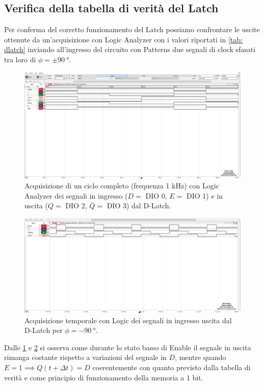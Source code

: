 \documentclass[10pt, a4paper, italian]{article}
\begin{document}
\subsection{Verifica della tabella di verità del Latch}
Per conferma del corretto funzionamento del Latch possiamo confrontare
le uscite ottenute da un'acquisizione con Logic Analyzer con i valori
riportati in \cref{tab: dlatch} inviando all'ingresso del circuito con
Patterns due segnali di clock sfasati tra loro di
$\phi = \pm \SI{90}{\degree}$.
\begin{figure}[htbp]
    \centering
    \includegraphics[width=\textwidth]{dlatch}
    \caption{Acquisizione di un ciclo completo (frequenza 1 kHz) con Logic
    Analyzer dei segnali in ingresso ($D =$ DIO 0, $E =$ DIO 1) e in uscita
    ($Q =$ DIO 2, $\overline{Q} =$ DIO 3) dal D-Latch.
    \label{fig: dlatch}}
\end{figure}
\begin{figure}[htbp]
	\includegraphics[width=\textwidth]{latch2}
	\caption{Acquisizione temporale con Logic dei segnali in ingresso uscita dal
	D-Latch per $\phi = -\SI{90}{\degree}$.
	\label{fig: Log_DLATCH2}}
\end{figure}

Dalle \cref{fig: dlatch} e \cref{fig: Log_DLATCH2} si osserva come durante lo
stato basso di Enable il segnale in uscita rimanga costante rispetto a
variazioni del segnale in $D$, mentre quando
$E = 1 \implies Q(t + \Delta t) = D$ coerentemente con quanto previsto dalla
tabella di verità e come principio di funzionamento della memoria a 1 bit.
\end{document}

